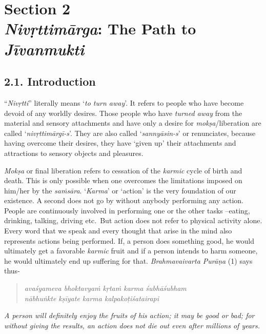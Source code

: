 \chapter[Section 2 \emph{Nivṛttimārga}: The Path to \emph{Jīvanmukti}]{Section 2\\ \emph{Nivṛttimārga}: The Path to \emph{Jīvanmukti}}

\section*{2.1. Introduction}

``\emph{Nivṛtti}'' literally means `\emph{to turn away}'. It refers to people who have become devoid of any worldly desires. Those people who have \emph{turned away} from the material and sensory attachments and have only a desire for \emph{mokṣa}/liberation are called `\emph{nivṛttimārgī-s}'. They are also called `\emph{sannyāsin-s}' or renunciates, because having overcome their desires, they have `given up' their attachments and attractions to sensory objects and pleasures.

\emph{Mokṣa} or final liberation refers to cessation of the \emph{karmic} cycle of birth and death. This is only possible when one overcomes the limitations imposed on him/her by the \emph{saṁsāra}. `\emph{Karma}' or `action' is the very foundation of our existence. A second does not go by without anybody performing any action. People are continuously involved in performing one or the other tasks --eating, drinking, talking, driving etc.\ But action does not refer to physical activity alone. Every word that we speak and every thought that arise in the mind also represents actions being performed. If, a person does something good, he would ultimately get a favorable \emph{karmic} fruit and if a person intends to harm someone, he would ultimately end up suffering for that. \emph{Brahmavaivarta Purāṇa} (1) says thus-

\begin{verse}
\emph{avaśyameva bhoktavyaṁ kṛtaṁ karma śubhāśubham }\\
\emph{nābhuṅkte kṣīyate karma kalpakoṭiśatairapi }
\end{verse}
\newpage

\emph{A person will definitely enjoy the fruits of his action; it may be good or bad; for without giving the results, an action does not die out even after millions of years.}
\vskip 2pt

